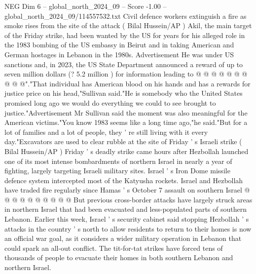 \begin{textsample}{NEG Dim 6 – global\_north\_2024\_09 – Score -1.00 – global\_north\_2024\_09/114557532.txt}
Civil defence workers extinguish a fire as smoke rises from the site of the attack ( Bilal Hussein/AP ) Akil, the main target of the Friday strike, had been wanted by the US for years for his alleged role in the 1983 bombing of the US embassy in Beirut and in taking American and German hostages in Lebanon in the 1980s.
Advertisement He was under US sanctions and, in 2023, the US State Department announced a reward of up to seven million dollars (? 5.2 million ) for information leading to @ @ @ @ @ @ @ @ @ @"."That individual has American blood on his hands and has a rewards for justice price on his head,"Sullivan said."He is somebody who the United States promised long ago we would do everything we could to see brought to justice."Advertisement Mr Sullivan said the moment was also meaningful for the American victims."You know 1983 seems like a long time ago,"he said."But for a lot of families and a lot of people, they ' re still living with it every day."Excavators are used to clear rubble at the site of Friday ' s Israeli strike ( Bilal Hussein/AP ) Friday ' s deadly strike came hours after Hezbollah launched one of its most intense bombardments of northern Israel in nearly a year of fighting, largely targeting Israeli military sites.
Israel ' s Iron Dome missile defence system intercepted most of the Katyusha rockets.
Israel and Hezbollah have traded fire regularly since Hamas ' s October 7 assault on southern Israel @ @ @ @ @ @ @ @ @ @ But previous cross-border attacks have largely struck areas in northern Israel that had been evacuated and less-populated parts of southern Lebanon.
Earlier this week, Israel ' s security cabinet said stopping Hezbollah ' s attacks in the country ' s north to allow residents to return to their homes is now an official war goal, as it considers a wider military operation in Lebanon that could spark an all-out conflict.
The tit-for-tat strikes have forced tens of thousands of people to evacuate their homes in both southern Lebanon and northern Israel.

\end{textsample}
